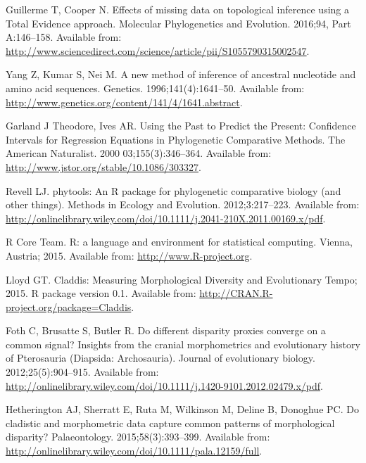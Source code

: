 \documentclass[12pt,letterpaper]{article}
\begin{document}
\begin{thebibliography}{10}
Guillerme T, Cooper N.
\newblock Effects of missing data on topological inference using a {T}otal
  {E}vidence approach.
\newblock Molecular Phylogenetics and Evolution. 2016;94, Part A:146--158.
\newblock Available from:
  \url{http://www.sciencedirect.com/science/article/pii/S1055790315002547}.

Yang Z, Kumar S, Nei M.
\newblock A new method of inference of ancestral nucleotide and amino acid
  sequences.
\newblock Genetics. 1996;141(4):1641--50.
\newblock Available from:
  \url{http://www.genetics.org/content/141/4/1641.abstract}.

Garland J Theodore, Ives AR.
\newblock Using the Past to Predict the Present: Confidence Intervals for
  Regression Equations in Phylogenetic Comparative Methods.
\newblock The {A}merican Naturalist. 2000 03;155(3):346--364.
\newblock Available from: \url{http://www.jstor.org/stable/10.1086/303327}.

Revell LJ.
\newblock phytools: An {R} package for phylogenetic comparative biology (and
  other things).
\newblock Methods in Ecology and Evolution. 2012;3:217--223.
\newblock Available from:
  \url{http://onlinelibrary.wiley.com/doi/10.1111/j.2041-210X.2011.00169.x/pdf}.

{R Core Team}. R: a language and environment for statistical computing. Vienna,
  Austria; 2015.
\newblock Available from: \url{http://www.R-project.org}.

Lloyd GT. Claddis: Measuring Morphological Diversity and Evolutionary Tempo;
  2015.
\newblock R package version 0.1.
\newblock Available from: \url{http://CRAN.R-project.org/package=Claddis}.

Foth C, Brusatte S, Butler R.
\newblock Do different disparity proxies converge on a common signal? Insights
  from the cranial morphometrics and evolutionary history of {P}terosauria
  ({D}iapsida: {A}rchosauria).
\newblock Journal of evolutionary biology. 2012;25(5):904--915.
\newblock Available from:
  \url{http://onlinelibrary.wiley.com/doi/10.1111/j.1420-9101.2012.02479.x/pdf}.

Hetherington AJ, Sherratt E, Ruta M, Wilkinson M, Deline B, Donoghue PC.
\newblock Do cladistic and morphometric data capture common patterns of
  morphological disparity?
\newblock Palaeontology. 2015;58(3):393--399.
\newblock Available from:
  \url{http://onlinelibrary.wiley.com/doi/10.1111/pala.12159/full}.


\end{thebibliography}
\end{document}
